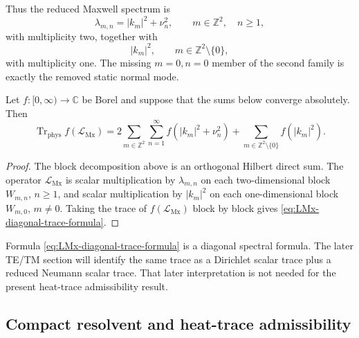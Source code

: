 \documentclass[11pt]{article}
\providecommand{\C}{\mathbb{C}}
\providecommand{\Z}{\mathbb{Z}}
\providecommand{\Trphys}{\operatorname{Tr}_{\mathrm{phys}}}
\providecommand{\abs}[1]{\left\lvert #1\right\rvert}
\providecommand{\paren}[1]{\left(#1\right)}
\providecommand{\LMx}{\mathcal L_{\mathrm{Mx}}}
\numberwithin{equation}{section}
\begin{document}
Thus the reduced Maxwell spectrum is
\begin{equation}
\label{eq:LMx-spectrum-list}
    \lambda_{m,n}
    =
    \abs{k_m}^2+\nu_n^2,
    \qquad
    m\in\Z^2,
    \quad n\ge1,
\end{equation}
with multiplicity two, together with
\begin{equation}
\label{eq:LMx-zero-branch-list}
    \abs{k_m}^2,
    \qquad
    m\in\Z^2\setminus\{0\},
\end{equation}
with multiplicity one.  The missing \(m=0,n=0\) member of the second family is exactly the removed static normal mode.

\begin{proposition}
\label{prop:diagonal-trace-formula}
Let \(f:[0,\infty)\to\C\) be Borel and suppose that the sums below converge absolutely.  Then
\begin{equation}
\label{eq:LMx-diagonal-trace-formula}
    \Trphys f(\LMx)
    =
    2\sum_{m\in\Z^2}\sum_{n=1}^{\infty}
    f\paren{\abs{k_m}^2+\nu_n^2}
    +
    \sum_{m\in\Z^2\setminus\{0\}}
    f\paren{\abs{k_m}^2} .
\end{equation}
\end{proposition}

\begin{proof}
The block decomposition above is an orthogonal Hilbert direct sum.  The operator \(\LMx\) is scalar multiplication by \(\lambda_{m,n}\) on each two-dimensional block \(W_{m,n}\), \(n\ge1\), and scalar multiplication by \(\abs{k_m}^2\) on each one-dimensional block \(W_{m,0}\), \(m\ne0\).  Taking the trace of \(f(\LMx)\) block by block gives \eqref{eq:LMx-diagonal-trace-formula}.
\end{proof}

\begin{remark}
\label{rem:not-yet-te-tm}
Formula \eqref{eq:LMx-diagonal-trace-formula} is a diagonal spectral formula.  The later TE/TM section will identify the same trace as a Dirichlet scalar trace plus a reduced Neumann scalar trace.  That later interpretation is not needed for the present heat-trace admissibility result.
\end{remark}

\subsection{Compact resolvent and heat-trace admissibility}
\label{subsec:compact-heat-trace}
\end{document}
